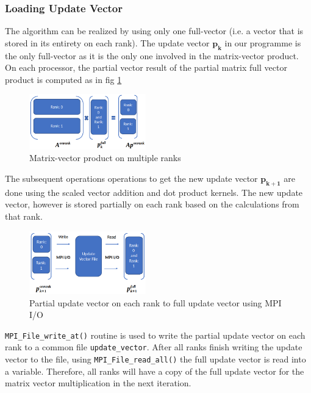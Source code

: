 \documentclass[sigplan,screen]{acmart}
\begin{document}
\subsubsection{Loading Update Vector}
The algorithm can be realized by using only one full-vector (i.e. a vector that is stored in its entirety on each rank). The update vector $\mathbf{p_k}$ in our programme is the only full-vector as it is the only one involved in the matrix-vector product. On each processor, the partial vector result of the partial matrix full vector product is computed as in fig \ref{fig2}
\begin{figure}[H]
	\begin{center}
		\includegraphics[width=0.45\textwidth]{plots/mpio_Ap.png}
	\end{center}
	\caption{Matrix-vector product on multiple ranks}
	\label{fig2} 
\end{figure}
The subsequent operations operations to get the new update vector $\mathbf{p_{k+1}}$ are done using the scaled vector addition and dot product kernels. The new update vector, however is stored partially on each rank based on the calculations from that rank.
\begin{figure}[H]
	\begin{center}
		\includegraphics[width=0.45\textwidth]{plots/mpio_pupdate.png}
	\end{center}
	\caption{Partial update vector on each rank to full update vector using MPI I/O}
	\label{fig3} 
\end{figure}

\texttt{MPI\_File\_write\_at()} routine is used to write the partial update vector on each rank to a common file \texttt{update\_vector}. After all ranks finish writing the update vector to the file, using \texttt{MPI\_File\_read\_all()} the full update vector is read into a variable. Therefore, all ranks will have a copy of the full update vector for the matrix vector multiplication in the next iteration.
\end{document}
